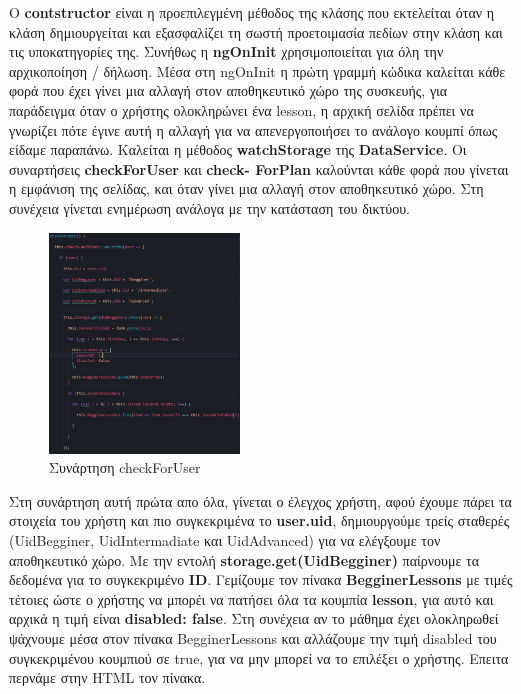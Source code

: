\documentclass[a4paper,12pt]{article}
\begin{document}
			Ο \textbf{contstructor} είναι η προεπιλεγμένη μέθοδος της κλάσης που εκτελείται όταν η κλάση δημιουργείται και εξασφαλίζει τη σωστή προετοιμασία πεδίων στην κλάση και τις υποκατηγορίες της.
			Συνήθως η \textbf{ngOnInit} χρησιμοποιείται για όλη την αρχικοποίηση / δήλωση. Μέσα στη ngOnInit η πρώτη γραμμή κώδικα καλείται κάθε φορά που έχει γίνει μια αλλαγή στον αποθηκευτικό χώρο της συσκευής, για παράδειγμα όταν ο χρήστης ολοκληρώνει ένα lesson, η αρχική σελίδα πρέπει να γνωρίζει πότε έγινε αυτή η αλλαγή για να απενεργοποιήσει το ανάλογο κουμπί όπως είδαμε παραπάνω. Καλείται η
			μέθοδος \textbf{watchStorage} της \textbf{DataService}. Οι συναρτήσεις \textbf{checkForUser} και \textbf{check-
			ForPlan} καλούνται κάθε φορά που γίνεται η εμφάνιση της σελίδας, και όταν γίνει μια αλλαγή στον αποθηκευτικό χώρο. Στη συνέχεια γίνεται ενημέρωση ανάλογα με την κατάσταση του δικτύου.

			\newpage
			\begin{figure}
				
				\caption{Συνάρτηση checkForUser}
				\vspace*{0.5cm}

				\includegraphics[width=0.45\textwidth]{checkUser}	
			\end{figure}

			Στη συνάρτηση αυτή πρώτα απο όλα, γίνεται ο έλεγχος χρήστη, αφού έχουμε πάρει τα στοιχεία του χρήστη και πιο συγκεκριμένα το \textbf{user.uid}, δημιουργούμε τρείς σταθερές (UidBegginer, UidIntermadiate και UidAdvanced) για να ελέγξουμε τον αποθηκευτικό χώρο. Με την εντολή \newline
			\textbf{storage.get(UidBegginer)} παίρνουμε τα δεδομένα για το συγκεκριμένο \textbf{ID}. Γεμίζουμε τον πίνακα \textbf{BegginerLessons} με τιμές τέτοιες ώστε ο χρήστης να μπορέι να πατήσει
			 όλα τα κουμπία \textbf{lesson}, για αυτό και αρχικά η τιμή είναι \textbf{disabled: false}. Στη συνέχεια αν το μάθημα έχει ολοκληρωθεί ψάχνουμε μέσα στον πίνακα BegginerLessons και αλλάζουμε την τιμή disabled του συγκεκριμένου κουμπιού σε true, για να μην μπορεί να το επιλέξει ο χρήστης. Επειτα περνάμε στην HTML τον πίνακα.
\end{document}
